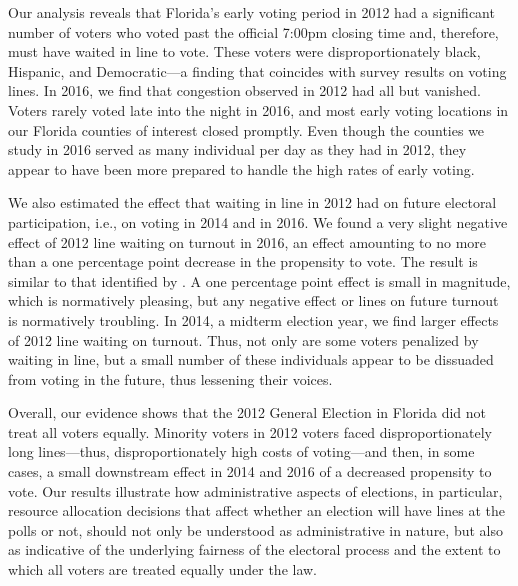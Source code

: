\documentclass[12pt,titlepage]{article}
\begin{document}
Our analysis reveals that Florida's early voting period in 2012 had a
significant number of voters who voted past the official 7:00pm
closing time and, therefore, must have waited in line to vote.  These
voters were disproportionately black, Hispanic, and Democratic---a
finding that coincides with survey results on voting lines.  In 2016,
we find that congestion observed in 2012 had all but vanished.  Voters
rarely voted late into the night in 2016, and most early voting
locations in our Florida counties of interest closed promptly.  Even
though the counties we study in 2016 served as many individual per day
as they had in 2012, they appear to have been more prepared to handle
the high rates of early voting.
  
We also estimated the effect that waiting in line in 2012 had on future
electoral participation, i.e., on voting in 2014 and in 2016.  We
found a very slight negative effect of 2012 line waiting on turnout in
2016, an effect amounting to no more than a one percentage point
decrease in the propensity to vote. The result is similar to that
identified by \citet{pettigrew:racegapwaittimes}.  A one percentage
point effect is small in magnitude, which is normatively pleasing, but
any negative effect or lines on future turnout is normatively
troubling.  In 2014, a midterm election year, we find larger effects
of 2012 line waiting on turnout.  Thus, not only are some voters
penalized by waiting in line, but a small number of these individuals
appear to be dissuaded from voting in the future, thus lessening their
voices.





Overall, our evidence shows that the 2012 General Election in Florida
did not treat all voters equally.  Minority voters in 2012 voters
faced disproportionately long lines---thus, disproportionately high
costs of voting---and then, in some cases, a small downstream effect
in 2014 and 2016 of a decreased propensity to vote.  Our results
illustrate how administrative aspects of elections, in particular,
resource allocation decisions that affect whether an election will
have lines at the polls or not, should not only be understood as
administrative in nature, but also as indicative of the underlying
fairness of the electoral process and the extent to which all voters
are treated equally under the law.
\end{document}
